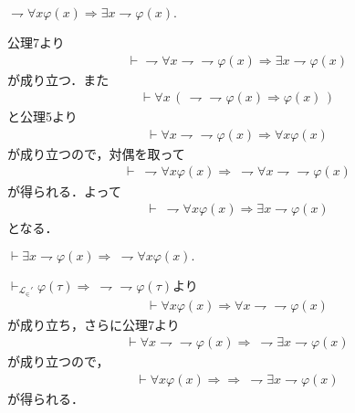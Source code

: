 	\begin{screen}
		$\rightharpoondown \forall x \varphi(x) \Longrightarrow
		\exists x \rightharpoondown \varphi(x).$
	\end{screen}
	
	公理7より
	\begin{align}
		\vdash \rightharpoondown \forall x 
		\rightharpoondown \rightharpoondown \varphi(x)
		\Longrightarrow \exists x \rightharpoondown \varphi(x)
	\end{align}
	が成り立つ．また
	\begin{align}
		\vdash \forall x\, (\, \rightharpoondown \rightharpoondown \varphi(x)
		\Longrightarrow \varphi(x)\, )
	\end{align}
	と公理5より
	\begin{align}
		\vdash \forall x \rightharpoondown \rightharpoondown \varphi(x)
		\Longrightarrow \forall x \varphi(x)
	\end{align}
	が成り立つので，対偶を取って
	\begin{align}
		\vdash\ \rightharpoondown \forall x \varphi(x) \Longrightarrow\ 
		\rightharpoondown \forall x \rightharpoondown \rightharpoondown \varphi(x)
	\end{align}
	が得られる．よって
	\begin{align}
		\vdash\ \rightharpoondown \forall x \varphi(x) \Longrightarrow
		\exists x \rightharpoondown \varphi(x)
	\end{align}
	となる．
	
	\begin{screen}
		$\vdash \exists x \rightharpoondown \varphi(x) 
		\Longrightarrow\ \rightharpoondown \forall x \varphi(x).$
	\end{screen}
	
	$\vdash_{\mathcal{L}_{\in}'} \varphi(\tau) \Longrightarrow\ 
	\rightharpoondown \rightharpoondown \varphi(\tau)$より
	\begin{align}
		\vdash \forall x \varphi(x) \Longrightarrow
		\forall x \rightharpoondown \rightharpoondown \varphi(x)
	\end{align}
	が成り立ち，さらに公理7より
	\begin{align}
		\vdash \forall x \rightharpoondown \rightharpoondown \varphi(x)
		\Longrightarrow\ \rightharpoondown \exists x \rightharpoondown \varphi(x)
	\end{align}
	が成り立つので，
	\begin{align}
		\vdash \forall x \varphi(x) \Longrightarrow
		\Longrightarrow\ \rightharpoondown \exists x \rightharpoondown \varphi(x)
	\end{align}
	が得られる．